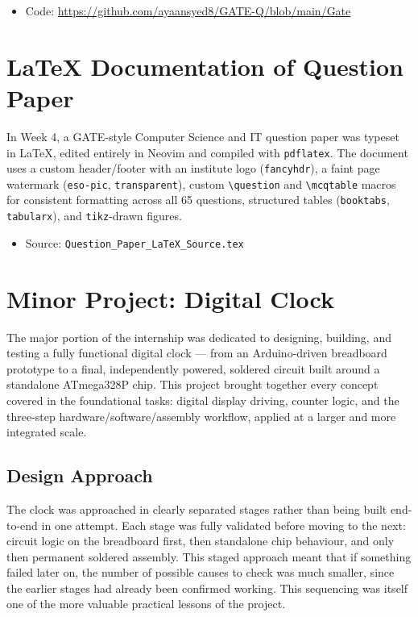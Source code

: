 \documentclass[12pt,a4paper]{report}
\begin{document}
\begin{itemize}
    \item Code: \url{https://github.com/ayaansyed8/GATE-Q/blob/main/Gate}
\end{itemize}

\chapter{LaTeX Documentation of Question Paper}
\label{ch:latex}

In Week 4, a GATE-style Computer Science and IT question paper was typeset in \LaTeX, edited entirely in Neovim and compiled with \texttt{pdflatex}. The document uses a custom header/footer with an institute logo (\texttt{fancyhdr}), a faint page watermark (\texttt{eso-pic}, \texttt{transparent}), custom \texttt{\textbackslash question} and \texttt{\textbackslash mcqtable} macros for consistent formatting across all 65 questions, structured tables (\texttt{booktabs}, \texttt{tabularx}), and \texttt{tikz}-drawn figures.

\begin{itemize}
    \item Source: \texttt{Question\_Paper\_LaTeX\_Source.tex}
\end{itemize}

\chapter{Minor Project: Digital Clock}
\label{ch:clock}

The major portion of the internship was dedicated to designing, building, and testing a fully functional digital clock --- from an Arduino-driven breadboard prototype to a final, independently powered, soldered circuit built around a standalone ATmega328P chip. This project brought together every concept covered in the foundational tasks: digital display driving, counter logic, and the three-step hardware/software/assembly workflow, applied at a larger and more integrated scale.

\section{Design Approach}
\label{sec:design}

The clock was approached in clearly separated stages rather than being built end-to-end in one attempt. Each stage was fully validated before moving to the next: circuit logic on the breadboard first, then standalone chip behaviour, and only then permanent soldered assembly. This staged approach meant that if something failed later on, the number of possible causes to check was much smaller, since the earlier stages had already been confirmed working. This sequencing was itself one of the more valuable practical lessons of the project.
\end{document}
